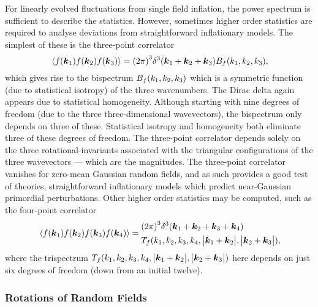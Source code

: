 For linearly evolved fluctuations from single field inflation, the power spectrum is sufficient to describe the statistics.
However, sometimes higher order statistics are required to analyse deviations from straightforward inflationary models.
The simplest of these is the three-point correlator
%
\begin{equation}
	\expval*{f(\vb*{k}_{1}) f(\vb*{k}_{2}) f(\vb*{k}_{3})}
	= {(2\pi)}^{3} \delta^{3}(\vb*{k}_{1} + \vb*{k}_{2} + \vb*{k}_{3}) B_{f}(k_{1},k_{2},k_{3}),
\end{equation}
%
which gives rise to the bispectrum \(B_{f}(k_{1},k_{2},k_{3})\) which is a symmetric function (due to statistical isotropy) of the three wavenumbers.
The Dirac delta again appears due to statistical homogeneity.
Although starting with nine degrees of freedom (due to the three three-dimensional wavevectors), the bispectrum only depends on three of these.
Statistical isotropy and homogeneity both eliminate three of these degrees of freedom.
The three-point correlator depends solely on the three rotational-invariants associated with the triangular configurations of the three wavevectors --- which are the magnitudes.
The three-point correlator vanishes for zero-mean Gaussian random fields, and as such provides a good test of theories, \ie{} straightforward inflationary models which predict near-Gaussian primordial perturbations.
Other higher order statistics may be computed, such as the four-point correlator
%
\begin{align}
	\expval*{f(\vb*{k}_{1}) f(\vb*{k}_{2}) f(\vb*{k}_{3}) f(\vb*{k}_{4})} =
	\begin{aligned}
		 & {(2\pi)}^{3} \delta^{3}(\vb*{k}_{1} + \vb*{k}_{2} + \vb*{k}_{3} + \vb*{k}_{4}) \\
		 & T_{f}(k_{1},k_{2},k_{3},k_{4},\big\lvert\vb*{k}_{1}+\vb*{k}_{2}\big\rvert,\big\lvert\vb*{k}_{2}+\vb*{k}_{3}\big\rvert),
	\end{aligned}
\end{align}
%
where the trispectrum \(T_{f}(k_{1},k_{2},k_{3},k_{4},\big\lvert\vb*{k}_{1}+\vb*{k}_{2}\big\rvert,\big\lvert\vb*{k}_{2}+\vb*{k}_{3}\big\rvert)\) here depends on just six degrees of freedom (down from an initial twelve).

\subsubsection{Rotations of Random Fields}

